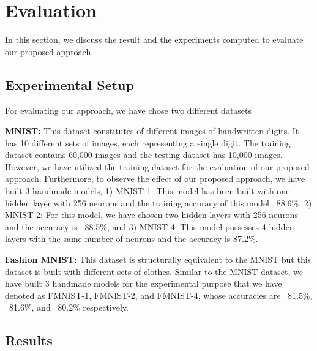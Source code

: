\section{Evaluation}
\label{sec:evaluation}
In this section, we discuss the result and the experiments computed to evaluate our proposed approach.
\subsection{Experimental Setup}
For evaluating our approach, we have chose two different datasets

\textbf{MNIST:}
This dataset \cite{lecun1998gradient} constitutes of different images of handwritten digits. It has 10 different sets of images, each representing a single digit. The training dataset contains 60,000 images and the testing dataset has 10,000 images. However, we have utilized the training dataset for the evaluation of our proposed approach. Furthermore, to observe the effect of our proposed approach, we have built 3 handmade models, 1) MNIST-1: This model has been built with one hidden layer with 256 neurons and the training accuracy of this model ~88.6\%, 2) MNIST-2: For this model, we have chosen two hidden layers with 256 neurons and the accuracy is ~88.5\%, and 3) MNIST-4: This model possesses 4 hidden layers with the same number of neurons and the accuracy is 87.2\%.

\textbf{Fashion MNIST:}
This dataset \cite{xiao2017fashion} is structurally equivalent to the MNIST but this dataset is built with different sets of clothes. Similar to the MNIST dataset, we have built 3 handmade models for the experimental purpose that we have denoted as FMNIST-1, FMNIST-2, and FMNIST-4, whose accuracies are ~81.5\%, ~81.6\%, and ~80.2\% respectively.
\subsection{Results}
